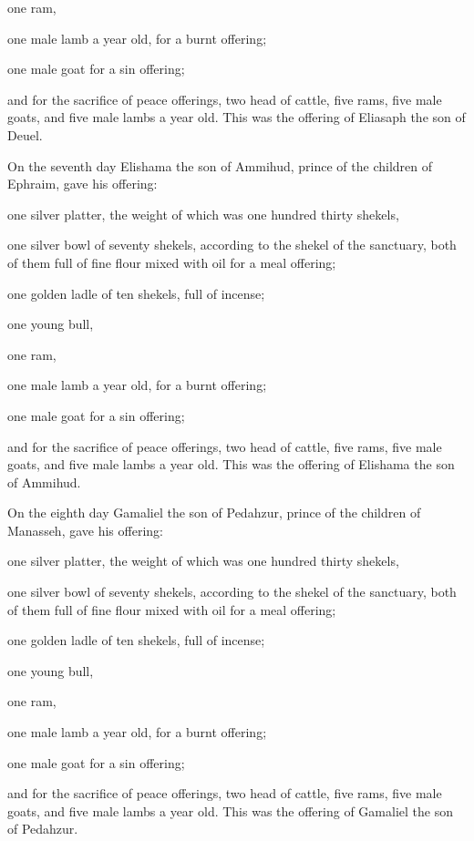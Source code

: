 one ram,

one male lamb a year old, for a burnt offering;


\myverse{}one male goat for a sin offering;


\myverse{}and for the sacrifice of peace offerings, two head of cattle,
five rams, five male goats, and five male lambs a year old. This was the offering of Eliasaph the son
of Deuel.


\myverse{}On the seventh day Elishama the son of Ammihud, prince of the
children of Ephraim,
\myverse{}gave his offering:

one silver platter, the weight of which was one hundred thirty shekels,

one silver bowl of seventy shekels, according to the shekel of the sanctuary, both of them
full of fine flour mixed with oil for a meal offering;


\myverse{}one golden ladle of ten shekels, full of incense;


\myverse{}one young bull,

one ram,

one male lamb a year old, for a burnt offering;


\myverse{}one male goat for a sin offering;


\myverse{}and for the sacrifice of peace offerings, two head of cattle,
five rams, five male goats, and five male lambs a year old. This was the offering of Elishama the son
of Ammihud.


\myverse{}On the eighth day Gamaliel the son of Pedahzur, prince of the
children of Manasseh,
\myverse{}gave his offering:

one silver platter, the weight of which was one hundred thirty shekels,

one silver bowl of seventy shekels, according to the shekel of the sanctuary, both of them
full of fine flour mixed with oil for a meal offering;


\myverse{}one golden ladle of ten shekels, full of incense;


\myverse{}one young bull,

one ram,

one male lamb a year old, for a burnt offering;


\myverse{}one male goat for a sin offering;


\myverse{}and for the sacrifice of peace offerings, two head of cattle,
five rams, five male goats, and five male lambs a year old. This was the offering of Gamaliel the son
of Pedahzur.


